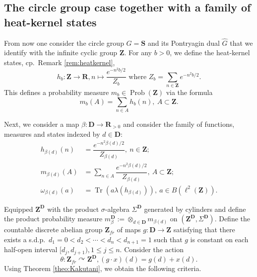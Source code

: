 \documentclass[a4paper,12pt]{amsart}
\numberwithin{equation}{section}
\theoremstyle{definition}
\newcommand{\act}{\curvearrowright}
\newcommand{\D}{\mathbf D}
\newcommand{\la}{\lambda}
\newcommand{\ot}{\otimes}\newcommand{\otmin}{\otimes_{\text{min}}}
\DeclareMathOperator{\Prob}{Prob}
\newcommand{\R}{\mathbf{R}}
\DeclareMathOperator{\Tr}{Tr}
\newcommand{\wh}{\widehat}
\newcommand{\Z}{\mathbf{Z}}
\begin{document}
\subsection{The circle group case together with a family of heat-kernel states}\label{sec:Zleaves}
%
From now one consider the circle group $G=\mathbf S$ and its Pontryagin dual $\wh G$ that we identify with the infinite cyclic group $\Z.$
For any $b>0$, we define the heat-kernel states, cp.~Remark \ref{rem:heatkernel},
$$h_b:\Z\to \R, n\mapsto \dfrac{e^{-n^2 b/2}}{Z_b} \text{ where } Z_b = \sum_{n\in\Z} e^{-n^2 b/2}.$$ 
This defines a probability measure $m_b\in\Prob(\Z)$ via the formula
$$m_b(A) = \sum_{n\in A} h_b(n), \ A\subset\Z.$$

Next, we consider a map $\beta:\D\to \R_{>0}$ and consider the family of functions, measures and states indexed by $d\in\D$:
\begin{align*} 
h_{\beta(d)}(n) & = \dfrac{e^{-n^2 \beta(d)/2}}{Z_{\beta(d)}},\ n\in\Z;\\
m_{\beta(d)} (A) & = \sum_{n\in A} \dfrac{e^{-n^2 \beta(d)/2}}{Z_{\beta(d)}}, \ A\subset \Z;\\
\omega_{\beta(d)}(a) & =\Tr(a \la(h_{\beta(d)} ) ),\ a\in B(\ell^2(\Z)).
\end{align*}

Equipped $\Z^\D$ with the product $\sigma$-algebra $\Sigma^\D$ generated by cylinders and define the product probability measure $m_\beta^\D:=\ot_{d\in\D} m_{\beta(d)}$ on $(\Z^\D , \Sigma^\D).$
Define the countable discrete abelian group $\Z_{fr}$ of maps $g:\D\to \Z$ satisfying that there exists a s.d.p.~$d_1=0< d_2 <\cdots<d_n<d_{n+1} = 1$ such that $g$ is constant on each half-open interval $[d_j,d_{j+1}), 1\leq j\leq n.$
Consider the action 
\begin{equation}\label{equa:thetaZ}\theta:\Z_{fr}\act \Z^\D, (g\cdot x)(d) = g(d) + x(d).\end{equation}
Using Theorem \ref{theo:Kakutani}, we obtain the following criteria.
\end{document}
